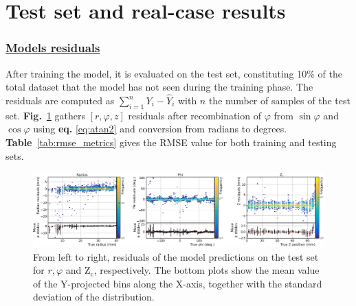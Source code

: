 

\section{Test set and real-case results}
\label{sec:results}
\subsubsection*{\underline{Models residuals}}

After training the model, it is evaluated on the test set, constituting 10\% of the total dataset that the model has not seen during the training phase. The residuals are computed as $\sum_{i=1}^n Y_i - \hat Y_i$ 
with $n$ the number of samples of the test set. \textbf{Fig.}~\ref{fig:all_residuals} gathers $[r, \varphi,z]$ residuals after recombination of $\varphi$ from $\sin \varphi$ and $\cos \varphi$ using \textbf{eq.} \ref{eq:atan2} and conversion from radians to degrees. \textbf{Table}~\ref{tab:rmse_metrics} gives the RMSE value for both training and testing sets.
\begin{figure}
\includegraphics[width=\textwidth]{images/residuals_subplots_grouped.eps}
\caption{From left to right, residuals of the model predictions on the test set for $r, \varphi$ and $\text{Z}_\text{c}$, respectively. The bottom plots show the mean value of the Y-projected bins along the X-axis, together with the standard deviation of the distribution.}
\label{fig:all_residuals}       %
\end{figure}


